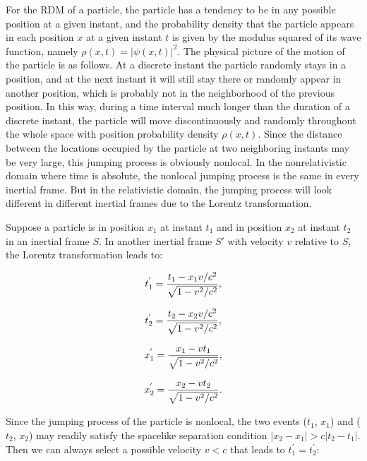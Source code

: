 For the RDM of a particle, the particle has a tendency to be in any possible position at a given instant, and the probability density that the particle appears in each position $x$ at a given instant $t$ is given by the modulus squared of its wave function, namely $\rho(x,t)=|\psi(x,t)|^2$. The physical picture of the motion of the particle is as follows. At a discrete instant the particle randomly stays in a position, and at the next instant it will still stay there or randomly appear in another position, which is probably not in the neighborhood of the previous position. In this way, during a time interval much longer than the duration of a discrete instant, the particle will move discontinuously and randomly throughout the whole space with position probability density $\rho(x,t)$. Since the distance between the locations occupied by the particle at two neighboring instants may be very large, this jumping process is obviously nonlocal. In the nonrelativistic domain where time is absolute, the nonlocal jumping process is the same in every inertial frame. But in the relativistic domain, the jumping process will look different in different inertial frames due to the Lorentz transformation.

Suppose a particle is in position $x_1$ at instant $t_1$ and in position $x_2$ at instant $t_2$ in an inertial frame $S$. In another inertial frame $S'$ with velocity $v$ relative to $S$, the Lorentz transformation leads to:

\begin{equation}
t_1^{'}={{t_1-x_1v/c^2} \over \sqrt{1-v^2/c^2} },
\label{}
\end{equation}

\begin{equation}
t_2^{'}={{t_2-x_2v/c^2} \over \sqrt{1-v^2/c^2} },
\label{}
\end{equation}

\begin{equation}
x_1^{'}={{x_1-vt_1} \over \sqrt{1-v^2/c^2} },
\label{}
\end{equation}

\begin{equation}
x_2^{'}={{x_2-vt_2} \over \sqrt{1-v^2/c^2} }.
\label{}
\end{equation}

\noindent Since the jumping process of the particle is nonlocal, the two events ($t_1$, $x_1$) and ($t_2$, $x_2$) may readily satisfy the spacelike separation condition $|x_2-x_1|>c|t_2-t_1|$. Then we can always select a possible velocity $v<c$ that leads to $t_1^{'}=t_2^{'}$:

